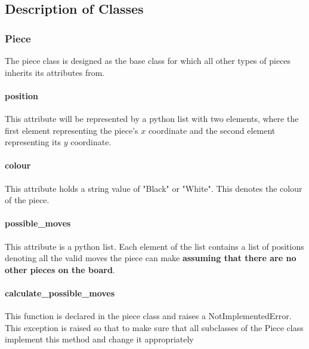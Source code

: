 \documentclass[]{report}
\begin{document}
\subsection{Description of Classes}
\subsubsection{Piece}
The piece class is designed as the base class for which all other types of pieces inherits its attributes from. 
\paragraph{position} This attribute will be represented by a python list with two elements, where the first element representing the piece's $x$ coordinate and the second element representing its $y$ coordinate. 
\paragraph{colour} This attribute holds a string value of "Black" or "White". This denotes the colour of the piece.
\paragraph{possible{\_}moves} This attribute is a python list. Each element of the list contains a list of positions denoting all the valid moves the piece can make \textbf{assuming that there are no other pieces on the board}.
\paragraph{calculate{\_}possible{\_}moves} This function is declared in the piece class and raises a NotImplementedError. This exception is raised so that to make sure that all subclasses of the Piece class implement this method and change it appropriately 
\end{document}
